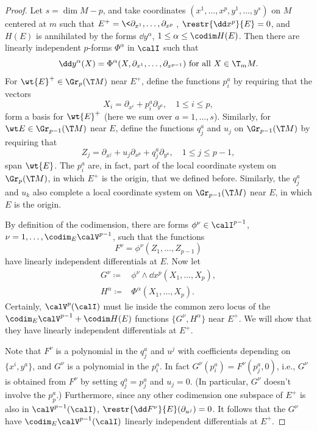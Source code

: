 \begin{proof}
    Let $s=\dim M-p$, and take coordinates $(x^1,\ldots,x^p,y^1,\ldots,y^s)$ on $M$ centered at $m$ such that $E^+=\<\partial_{x^1},\ldots,\partial_{x^p}\>$, $\restr{\dd x^p}{E}=0$, and $H(E)$ is annihilated by the forms $\dd y^\alpha$, $1\leq\alpha\leq \codim H(E)$. Then there are linearly independent $p$-forms $\Phi^\alpha$ in $\calI$ such that 
    \[\dd y^\alpha(X)=\Phi^\alpha(X,\partial_{x^1},\ldots,\partial_{x^{p-1}})\text{ for all }X\in\T_m M.\label{eq 8.4 Ivey}\]
    For $\wt{E}^+\in\Gr_p(\T M)$ near $E^+$, define the functions $p^a_i$ by requiring that the vectors 
    \[X_i=\partial_{x^i}+p^a_i\partial_{y^a},\quad 1\leq i\leq p,\]
    form a basis for $\wt{E}^+$ (here we sum over $a=1,\ldots,s$). Similarly, for $\wt E\in\Gr_{p-1}(\T M)$ near $E$, define the functions $q^a_j$ and $u_j$ on $\Gr_{p-1}(\T M)$ by requiring that 
    \[Z_j=\partial_{x^j}+u_j\partial_{x^p}+q^a_j\partial_{y^a},\quad 1\leq j\leq p-1,\]
    span $\wt{E}$. The $p^a_i$ are, in fact, part of the local coordinate system on $\Gr_p(\T M)$, in which $E^+$ is the origin, that we defined before. Similarly, the $q^a_j$ and $u_k$ also complete a local coordinate system on $\Gr_{p-1}(\T M)$ near $E$, in which $E$ is the origin.

    By definition of the codimension, there are forms $\phi^\nu\in\calI^{p-1}$, $\nu=1,\ldots,\codim_E\calV^{p-1}$, such that the functions 
    \[F^\nu=\phi^\nu(Z_1,\ldots,Z_{p-1})\]
    have linearly independent differentials at $E$. Now let 
    \begin{align}
        G^\nu\coloneqq &\phi^\nu\wedge\dd x^p(X_1,\ldots,X_p),\\
        H^\alpha\coloneqq &\Phi^\alpha(X_1,\ldots,X_p).
    \end{align}
    Certainly, $\calV^p(\calI)$ must lie inside the common zero locus of the $\codim_E\calV^{p-1}+\codim H(E)$ functions $\{G^\nu,H^\alpha\}$ near $E^+$. We will show that they have linearly independent differentials at $E^+$.

    Note that $F^\nu$ is a polynomial in the $q^a_j$ and $u^j$ with coefficients depending on $\{x^i,y^a\}$, and $G^\nu$ is a polynomial in the $p^a_i$. In fact $G^\nu(p^a_i)=F^\nu(p^a_j,0)$, i.e., $G^\nu$ is obtained from $F^\nu$ by setting $q^a_j=p^a_j$ and $u_j=0$. (In particular, $G^\nu$ doesn't involve the $p^a_p$.) Furthermore, since any other codimension one subspace of $E^+$ is also in $\calV^{p-1}(\calI)$, $\restr{\dd F^\nu}{E}(\partial_{u^j})=0$. It follows that the $G^\nu$ have $\codim_E \calV^{p-1}(\calI)$ linearly independent differentials at $E^+$.


\end{proof}
